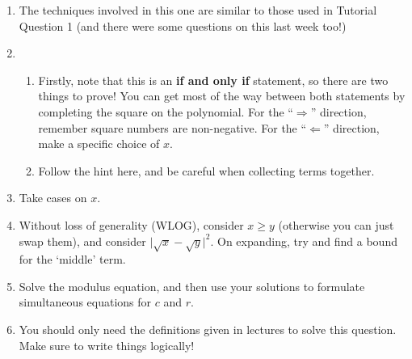 \documentclass[
  12pt,
  a4paper]{extarticle}
\providecommand{\tightlist}{%
  \setlength{\itemsep}{0pt}\setlength{\parskip}{0pt}}
\theoremstyle{plain}
\theoremstyle{definition}
\theoremstyle{plain}
\theoremstyle{plain}
\theoremstyle{plain}
\theoremstyle{plain}
\theoremstyle{definition}
\theoremstyle{definition}
\newtheorem*{Completeness Axiom*}{Completeness Axiom}\newtheorem{Completeness Axiom}{Completeness Axiom}[section]
\theoremstyle{remark}
\theoremstyle{remark}
\renewcommand{\;}{\,}
\begin{document}
\begin{enumerate}
\def\labelenumi{\arabic{enumi}.}
\item
  The techniques involved in this one are similar to those used in Tutorial Question 1 (and there were some questions on this last week too!)
\item
  \begin{enumerate}
  \def\labelenumii{\roman{enumii})}
  \tightlist
  \item
    Firstly, note that this is an \textbf{if and only if} statement, so there are two things to prove! You can get most of the way between both statements by completing the square on the polynomial. For the ``\(\Rightarrow\)'' direction, remember square numbers are non-negative. For the ``\(\Leftarrow\)'' direction, make a specific choice of \(x\).
  \item
    Follow the hint here, and be careful when collecting terms together.
  \end{enumerate}
\item
  Take cases on \(x\).
\item
  Without loss of generality (WLOG), consider \(x \geq y\) (otherwise you can just swap them), and consider \(\lvert \sqrt{x} - \sqrt{y} \rvert^2\). On expanding, try and find a bound for the `middle' term.
\item
  Solve the modulus equation, and then use your solutions to formulate simultaneous equations for \(c\) and \(r\).
\item
  You should only need the definitions given in lectures to solve this question. Make sure to write things logically!
\end{enumerate}
\end{document}
